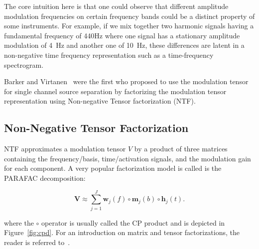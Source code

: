 {{%
The core intuition here is that one could observe that different amplitude modulation frequencies on certain frequency bands could be a distinct property of some instruments.
For example, if we mix together two harmonic signals having a fundamental frequency of 440Hz where one signal has a stationary amplitude modulation of 4~Hz and another one of 10~Hz, these differences are latent in a non-negative time frequency representation such as a time-frequency spectrogram.

Barker and Virtanen~\cite{barker13} were the first who proposed to use the modulation tensor for single channel source separation by factorizing the modulation tensor representation using Non-negative Tensor factorization (NTF).

\subsection{Non-Negative Tensor Factorization}

%
%
%

NTF approximates a modulation tensor \(V\) by a product of three matrices containing the frequency/basis, time/activation signals, and the modulation gain for each component.
A very popular factorization model is called is the PARAFAC decomposition:

\begin{equation}
   \mathbf{V} \approx \sum\limits_{j=1}^{J} \mathbf{w}_{j}(f) \circ \mathbf{m}_{j}(b) \circ \mathbf{h}_{j}(t).
\end{equation}

where the \(\circ\) operator is usually called the CP product and is depicted in Figure~\ref{fig:cpd}.
For an introduction on matrix and tensor factorizations, the reader is referred to~\cite{cichocki09}.

}}
